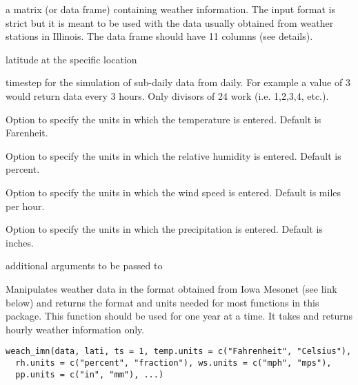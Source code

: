 \documentclass[letterpaper]{book}
\begin{document}
\begin{Arguments}
\begin{ldescription}
\item[\code{X}] a matrix (or data frame) containing weather
information.  The input format is strict but it is meant
to be used with the data usually obtained from weather
stations in Illinois. The data frame should have 11
columns (see details).

\item[\code{lati}] latitude at the specific location

\item[\code{ts}] timestep for the simulation of sub-daily data
from daily. For example a value of 3 would return data
every 3 hours. Only divisors of 24 work (i.e. 1,2,3,4,
etc.).

\item[\code{temp.units}] Option to specify the units in which
the temperature is entered. Default is Farenheit.

\item[\code{rh.units}] Option to specify the units in which the
relative humidity is entered. Default is percent.

\item[\code{ws.units}] Option to specify the units in which the
wind speed is entered. Default is miles per hour.

\item[\code{pp.units}] Option to specify the units in which the
precipitation is entered. Default is inches.

\item[\code{list()}] additional arguments to be passed to
\end{ldescription}
\end{Arguments}
%
\begin{Description}\relax
Manipulates weather data in the format obtained from Iowa
Mesonet (see link below) and returns the format and units
needed for most functions in this package. This function
should be used for one year at a time.  It takes and
returns hourly weather information only.
\end{Description}
%
\begin{Usage}
\begin{verbatim}
weach_imn(data, lati, ts = 1, temp.units = c("Fahrenheit", "Celsius"),
  rh.units = c("percent", "fraction"), ws.units = c("mph", "mps"),
  pp.units = c("in", "mm"), ...)
\end{verbatim}
\end{Usage}
\end{document}
